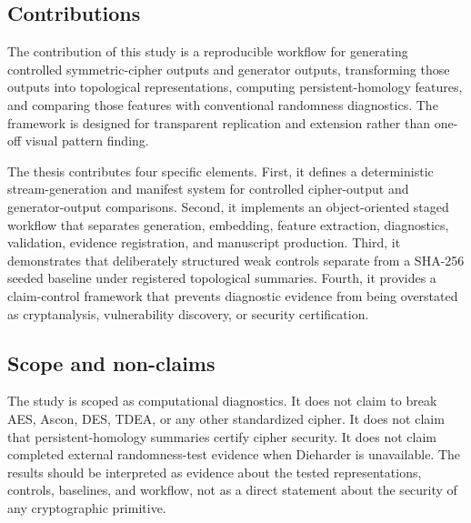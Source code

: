 \subsection{Contributions}
\label{subsec:introduction-contributions}

The contribution of this study is a reproducible workflow for generating controlled symmetric-cipher outputs and generator outputs, transforming those outputs into topological representations, computing persistent-homology features, and comparing those features with conventional randomness diagnostics. The framework is designed for transparent replication and extension rather than one-off visual pattern finding.

The thesis contributes four specific elements. First, it defines a deterministic stream-generation and manifest system for controlled cipher-output and generator-output comparisons. Second, it implements an object-oriented staged workflow that separates generation, embedding, feature extraction, diagnostics, validation, evidence registration, and manuscript production. Third, it demonstrates that deliberately structured weak controls separate from a SHA-256 seeded baseline under registered topological summaries. Fourth, it provides a claim-control framework that prevents diagnostic evidence from being overstated as cryptanalysis, vulnerability discovery, or security certification.

\subsection{Scope and non-claims}
\label{subsec:introduction-scope}

The study is scoped as computational diagnostics. It does not claim to break AES, Ascon, DES, TDEA, or any other standardized cipher. It does not claim that persistent-homology summaries certify cipher security. It does not claim completed external randomness-test evidence when Dieharder is unavailable. The results should be interpreted as evidence about the tested representations, controls, baselines, and workflow, not as a direct statement about the security of any cryptographic primitive.
